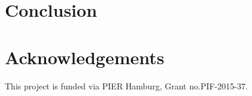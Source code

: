 \documentclass[a4paper,10pt]{article}
\newcommand*{\notFOREPJ}{}%
\begin{document}
\section{Conclusion}
\label{sec:conclusion}
\ifdefined\notFOREPJ
 
\else
 
\fi

\section*{Acknowledgements}
This project is funded via PIER Hamburg, Grant no.PIF-2015-37.

{\small


% 
% 
% 




}
\end{document}
